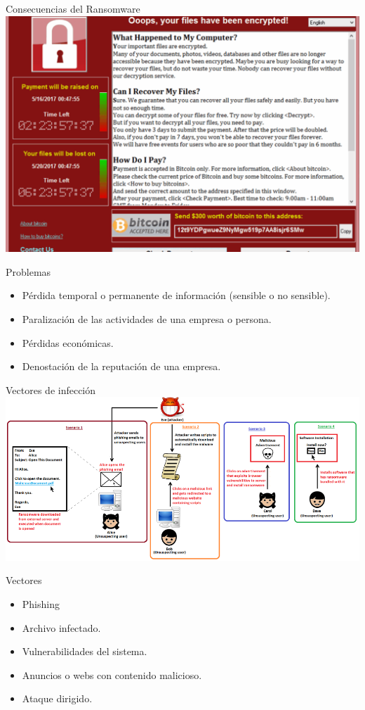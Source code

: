 \documentclass[10pt]{beamer}
\begin{document}
\begin{frame}[fragile]{Consecuencias del Ransomware}
	\centering
	\includegraphics[scale=0.16]{./Imagenes/ransomware3.png}
	\pause
	\begin{block}{Problemas}
		\begin{itemize}
			\item Pérdida temporal o permanente de información (sensible o no sensible).
			\pause
			\item Paralización de las actividades de una empresa o persona.
			\pause
			\item Pérdidas económicas.
			\pause
			\item Denostación de la reputación de una empresa.
		\end{itemize}
	\end{block}
\end{frame}

\begin{frame}[fragile]{Vectores de infección}
	\centering
	\includegraphics[scale=0.36]{./Imagenes/ransomware4.png}
	\pause
	\begin{block}{Vectores}
		\begin{itemize}
			\item Phishing
			\pause
			\item Archivo infectado.
			\pause
			\item Vulnerabilidades del sistema.
			\pause
			\item Anuncios o webs con contenido malicioso.
			\pause
			\item Ataque dirigido.
		\end{itemize}
	\end{block}
\end{frame}
\end{document}
